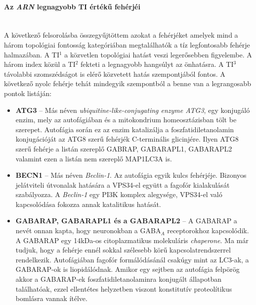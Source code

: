 \documentclass[a4paper,12pt]{article}
\begin{document}
				\paragraph{Az \textit{ARN} legnagyobb TI értékű fehérjéi} \mbox{}\\
				A következő felsorolásba összegyűjtöttem azokat a fehérjéket amelyek mind a három topológiai fontosság kategóriában megtalálhatók a tíz legfontosabb fehérje halmazában. 			
				A TI$^1$ a közvetlen topológiai hatást veszi legerősebben figyelembe. A három index közül a TI$^2$ fekteti a legnagyobb hangsúlyt az önhatásra. A TI$^3$  távolabbi szomszédságot is elérő közvetett hatás szempontjából fontos. A következő nyolc fehérje tehát mindegyik szempontból a benne van a legrangosabb pontok listáján:
				
				\begin{itemize}
					\item \textbf{ATG3} -- Más néven \textit{ubiquitine-like-conjugating enzyme ATG3}, egy konjugáló enzim, mely az autofágiában és a mitokondrium homeosztázisban tölt be szerepet. Autofágia során ez az enzim katalizálja a foszfatidiletanolamin konjugációját az ATG8 szerű fehérjék C-terminális glicinjére. Ilyen ATG8 szerű fehérje a listán szereplő GABRAP, GABARAPL1, GABARAPL2 valamint ezen a listán nem szereplő MAP1LC3A is. \cite{autophagy_proteins}

					\item \textbf{BECN1} -- Más néven \textit{Beclin-1}. Az autofágia egyik kulcs fehérjéje. Bizonyos jelátviteli útvonalak hatására a VPS34-el együtt a fagofór kialakulását szabályozza. A \textit{Beclin-1} egy PI3K komplex alegysége, VPS34-el való kapcsolódása fokozza annak katalitikus hatását. \cite{autophagy_proteins}
					
					\item \textbf{GABARAP, GABARAPL1 és a GABARAPL2} -- A GABARAP a nevét onnan kapta, hogy neuronokban a GABA$_A$ receptorokhoz kapcsolódik. A GABARAP egy 14kDa-os citoplazmatikus molekuláris \textit{chaperone}. Ma már tudjuk, hogy a fehérje ennél sokkal szélesebb körű kapcsolatrendszerrel rendelkezik. Autofágiában fagofór formálódásánál csakúgy mint az LC3-ak, a GABARAP-ok is liopidálódnak. Amikor egy sejtben az autofágia felpörög akkor a GABARAP-ek foszfatidiletanolaminra konjugált állapotban találhatóak, ezzel ellentétes helyzetben viszont konstitutív proteolítikus bomlásra vannak ítélve. \cite{atg8_like}


\end{itemize}
\end{document}
